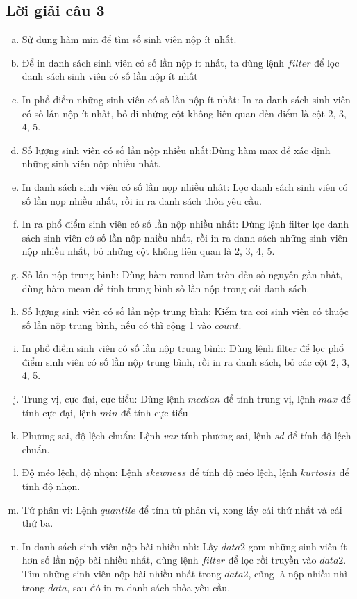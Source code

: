 \documentclass[a4paper]{article}
\theoremstyle{definition}
\begin{document}
\subsection{Lời giải câu 3}
\begin{enumerate}[a)]
    \item Sử dụng hàm min để tìm số sinh viên nộp ít nhất.
    \item Để in danh sách sinh viên có số lần nộp ít nhất, ta dùng lệnh $filter$ để lọc danh sách sinh viên có số lần nộp ít nhất
    \item In phổ điểm những sinh viên có số lần nộp ít nhất: In ra danh sách sinh viên có số lần nộp ít nhất, bỏ đi nhứng cột không liên quan đến điểm là cột 2, 3, 4, 5.
    \item Số lượng sinh viên có số lần nộp nhiều nhất:Dùng hàm max để xác định những sinh viên nộp nhiều nhất.
    \item In danh sách sinh viên có số lần nọp nhiều nhât: Lọc danh sách sinh viên có số lần nọp nhiều nhất, rồi in ra danh sách thỏa yêu cầu.
    \item In ra phổ điểm sinh viên có số lần nộp nhiều nhất: Dùng lệnh filter lọc danh sách sinh viên cớ số lần nộp nhiều nhất, rồi in ra danh sách những sinh viên nộp nhiều nhất, bỏ những cột không liên quan là 2, 3, 4, 5.
    \item Số lần nộp trung bình: Dùng hàm round làm tròn đến số nguyên gần nhất, dùng hàm mean để tính trung bình số lần nộp trong cái danh sách.
    \item Số lượng sinh viên có số lần nộp trung bình: Kiểm tra coi sinh viên có thuộc số lần nộp trung bình, nếu có thì cộng 1 vào $count$.
    \item In phổ điểm sinh viên có số lần nộp trung bình:  Dùng lệnh filter để lọc phổ điểm sinh viên có số lần nộp trung bình, rồi in ra danh sách, bỏ các cột 2, 3, 4, 5.
    \item Trung vị, cực đại, cực tiểu: Dùng lệnh $median$ để tính trung vị, lệnh $max$ để tính cực đại, lệnh $min$ để tính cực tiểu
    \item Phương sai, độ lệch chuẩn: Lệnh $var$ tính phương sai, lệnh $sd$ để tính độ lệch chuẩn.
    \item Độ méo lệch, độ nhọn: Lệnh $skewness$ để tính độ méo lệch, lệnh $kurtosis$ để tính độ nhọn.
    \item Tứ phân vi: Lệnh $quantile$ để tính tứ phân vi, xong lấy cái thứ nhất và cái thứ ba.
    \item In danh sách sinh viên nộp bài nhiều nhì: Lấy $data2$ gom những sinh viên ít hơn số lần nộp bài nhiều nhất, dùng lệnh $filter$ để lọc rồi truyền vào $data2$. Tìm những sinh viên nộp bài nhiều nhất trong $data2$, cũng là nộp nhiều nhì trong $data$, sau đó in ra danh sách thỏa yêu cầu. 

\end{enumerate}
\end{document}

